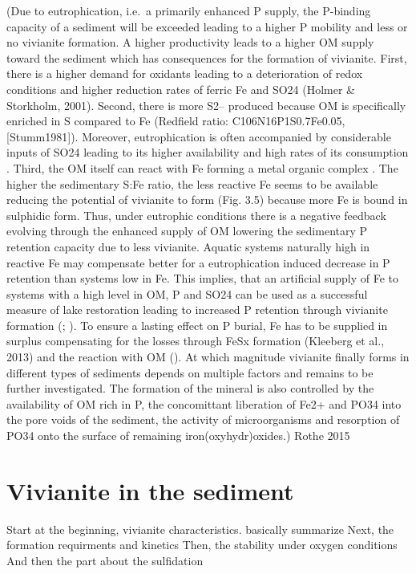 \documentclass[12pt,twoside]{book}
\begin{document}
(Due to eutrophication, i.e.~a primarily enhanced P supply, the P-binding capacity of a sediment will be exceeded leading to a higher P mobility and less or no vivianite formation. A higher productivity leads to a higher OM supply toward the sediment which has consequences for the formation of vivianite. First, there is a higher demand for oxidants leading to a deterioration of redox conditions and higher reduction rates of ferric Fe and SO24 (Holmer \& Storkholm, 2001). Second, there is more S2-- produced because OM is specifically enriched in S compared to Fe (Redfield ratio: C106N16P1S0.7Fe0.05, {[}Stumm1981{]}). Moreover, eutrophication is often accompanied by considerable inputs of SO24 leading to its higher availability and high rates of its consumption \citep{Holmer2001, Zak2006}. Third, the OM itself can react with Fe forming a metal organic complex \citep{Lalonde2012}. The higher the sedimentary S:Fe ratio, the less reactive Fe seems to be available reducing the potential of vivianite to form (Fig. 3.5) because more Fe is bound in sulphidic form. Thus, under eutrophic conditions there is a negative feedback evolving through the enhanced supply of OM lowering the sedimentary P retention capacity due to less vivianite. Aquatic systems naturally high in reactive Fe may compensate better for a eutrophication induced decrease in P retention than systems low in Fe. This implies, that an artificial supply of Fe to systems with a high level in OM, P and SO24 can be used as a successful measure of lake restoration leading to increased P retention through vivianite formation (\citet{Kleeberg2013}; \citet{Rothe2014}). To ensure a lasting effect on P burial, Fe has to be supplied in surplus compensating for the losses through FeSx formation (Kleeberg et al., 2013) and the reaction with OM (\citet{Lalonde2012}). At which magnitude vivianite finally forms in different types of sediments depends on multiple factors and remains to be further investigated. The formation of the mineral is also controlled by the availability of OM rich in P, the concomittant liberation of Fe2+ and PO34 into the pore voids of the sediment, the activity of microorganisms and resorption of PO34 onto the surface of remaining iron(oxyhydr)oxides.) Rothe 2015

\section{Vivianite in the sediment}\label{vivianite-in-the-sediment}

Start at the beginning, vivianite characteristics.
basically summarize \citet{Rothe2016}
Next, the formation requirments and kinetics \citep{Paskin2024}
Then, the stability under oxygen conditions
And then the part about the sulfidation
\end{document}

